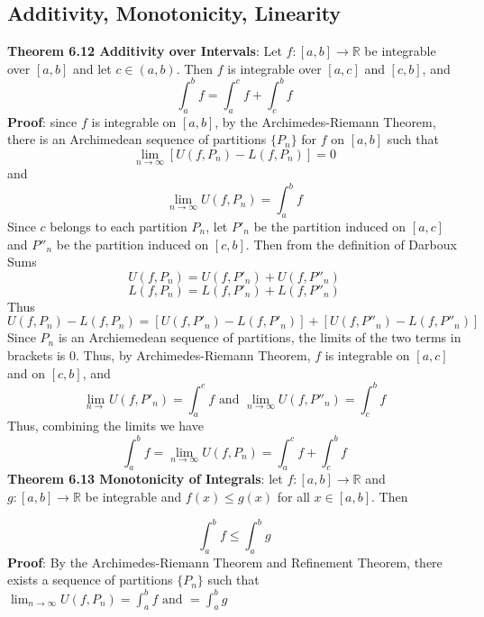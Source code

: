\documentclass{article}
\begin{document}
    \subsection{Additivity, Monotonicity, Linearity}
    \textbf{Theorem 6.12 Additivity over Intervals}: Let $f \colon [a, b] \rightarrow \mathbb{R}$ be integrable over $[a, b]$ and let $c \in (a, b)$. Then $f$ is integrable over $[a,c]$ and $[c, b]$, and
    \[\int_a^b f = \int_a^c f+ \int_c^b f\]
    \textbf{Proof}: since $f$ is integrable on $[a, b]$, by the Archimedes-Riemann Theorem, there is an Archimedean sequence of partitions $\{P_n\}$ for $f$ on $[a, b]$ such that
    \[\lim_{n \rightarrow \infty}[U(f, P_n) - L(f, P_n)] = 0\]
    and
    \[\lim_{n \rightarrow \infty}U(f, P_n) = \int_a^b f\]
    Since $c$ belongs to each partition $P_n$, let $P'_n$ be the partition induced on $[a, c]$ and $P''_n$ be the partition induced on $[c,b]$. Then from the definition of Darboux Sums
    \[U(f, P_n) = U(f, P'_n) + U(f, P''_n)\]
    \[L(f, P_n) = L(f, P'_n) + L(f, P''_n)\]
    Thus
    \[U(f, P_n) - L(f, P_n) = [U(f, P'_n) - L(f, P'_n)] + [U(f, P''_n) - L(f, P''_n)]\]
    Since $P_n$ is an Archiemedean sequence of partitions, the limits of the two terms in brackets is $0$. Thus, by Archimedes-Riemann Theorem, $f$ is integrable on $[a, c]$ and on $[c, b]$, and
    \[\lim_{n \rightarrow} U(f, P'_n) = \int_a^c f \text{ and } \lim_{n \rightarrow \infty}U(f, P''_n) = \int_c^b f\]
    Thus, combining the limits we have
    \[\int_a^b f = \lim_{n \rightarrow \infty}U(f, P_n) = \int_a^c f + \int_c^b f\]
    \textbf{Theorem 6.13 Monotonicity of Integrals}: let $f \colon [a, b] \rightarrow \mathbb{R}$ and $g \colon [a, b] \rightarrow \mathbb{R}$ be integrable and $f(x) \leq g(x)$ for all $x \in [a,b]$. Then

    \[\int_a^b f \leq \int_a^b g\]
    \textbf{Proof}: By the Archimedes-Riemann Theorem and Refinement Theorem, there exists a sequence of partitions $\{P_n\}$ such that $\lim_{n \rightarrow \infty}U(f, P_n) = \int_a^b f \text{ and  } = \int_a^b g$
\end{document}
